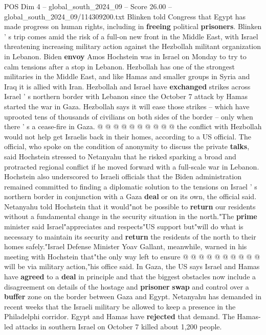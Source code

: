 \begin{textsample}{POS Dim 4 – global\_south\_2024\_09 – Score 26.00 – global\_south\_2024\_09/114309200.txt}
Blinken told Congress that Egypt has made progress on human rights, including in \textbf{freeing} political \textbf{prisoners}.
Blinken ' s trip comes amid the risk of a full-on new front in the Middle East, with Israel threatening increasing military action against the Hezbollah militant organization in Lebanon.
Biden \textbf{envoy} Amos Hochstein was in Israel on Monday to try to calm tensions after a stop in Lebanon.
Hezbollah has one of the strongest militaries in the Middle East, and like Hamas and smaller groups in Syria and Iraq it is allied with Iran.
Hezbollah and Israel have \textbf{exchanged} strikes across Israel ' s northern border with Lebanon since the October 7 attack by Hamas started the war in Gaza.
Hezbollah says it will ease those strikes -- which have uprooted tens of thousands of civilians on both sides of the border -- only when there ' s a cease-fire in Gaza. @ @ @ @ @ @ @ @ @ @ the conflict with Hezbollah would not help get Israelis back in their homes, according to a US official.
The official, who spoke on the condition of anonymity to discuss the private \textbf{talks}, said Hochstein stressed to Netanyahu that he risked sparking a broad and protracted regional conflict if he moved forward with a full-scale war in Lebanon.
Hochstein also underscored to Israeli officials that the Biden administration remained committed to finding a diplomatic solution to the tensions on Israel ' s northern border in conjunction with a Gaza \textbf{deal} or on its own, the official said.
Netanyahu told Hochstein that it would"not be possible to \textbf{return} our residents without a fundamental change in the security situation in the north."The \textbf{prime} minister said Israel"appreciates and respects"US support but"will do what is necessary to maintain its security and \textbf{return} the residents of the north to their homes safely."Israel Defense Minister Yoav Gallant, meanwhile, warned in his meeting with Hochstein that"the only way left to ensure @ @ @ @ @ @ @ @ @ @ will be via military action,"his office said.
In Gaza, the US says Israel and Hamas have \textbf{agreed} to a \textbf{deal} in principle and that the biggest obstacles now include a disagreement on details of the hostage and \textbf{prisoner} \textbf{swap} and control over a \textbf{buffer} zone on the border between Gaza and Egypt.
Netanyahu has demanded in recent weeks that the Israeli military be allowed to keep a presence in the Philadelphi corridor.
Egypt and Hamas have \textbf{rejected} that demand.
The Hamas-led attacks in southern Israel on October 7 killed about 1,200 people.

\end{textsample}
